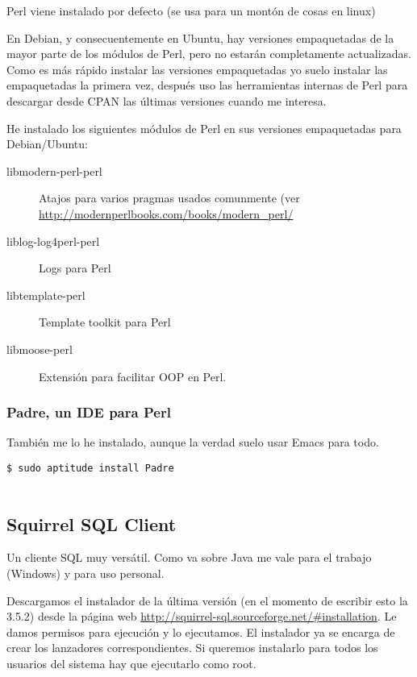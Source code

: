 Perl viene instalado por defecto (se usa para un montón de cosas en
linux)

En Debian, y consecuentemente en Ubuntu, hay versiones empaquetadas de
la mayor parte de los módulos de Perl, pero no estarán completamente
actualizadas. Como es más rápido instalar las versiones empaquetadas yo
suelo instalar las empaquetadas la primera vez, después uso las
herramientas internas de Perl para descargar desde CPAN las últimas
versiones cuando me interesa.

He instalado los siguientes módulos de Perl en sus versiones
empaquetadas para Debian/Ubuntu:

\begin{description}
\item[libmodern-perl-perl]
Atajos para varios pragmas usados comunmente (ver
\url{http://modernperlbooks.com/books/modern_perl/}
\item[liblog-log4perl-perl]
Logs para Perl
\item[libtemplate-perl]
Template toolkit para Perl
\item[libmoose-perl]
Extensión para facilitar OOP en Perl.
\end{description}

\subsubsection{Padre, un IDE para Perl}\label{padre-un-ide-para-perl}

También me lo he instalado, aunque la verdad suelo usar Emacs para todo.

\begin{verbatim}
$ sudo aptitude install Padre
        
\end{verbatim}

\subsection{Squirrel SQL Client}\label{squirrel-sql-client}

Un cliente SQL muy versátil. Como va sobre Java me vale para el trabajo
(Windows) y para uso personal.

Descargamos el instalador de la última versión (en el momento de
escribir esto la 3.5.2) desde la página web
\url{http://squirrel-sql.sourceforge.net/\#installation}. Le damos
permisos para ejecución y lo ejecutamos. El instalador ya se encarga de
crear los lanzadores correspondientes. Si queremos instalarlo para todos
los usuarios del sistema hay que ejecutarlo como root.

